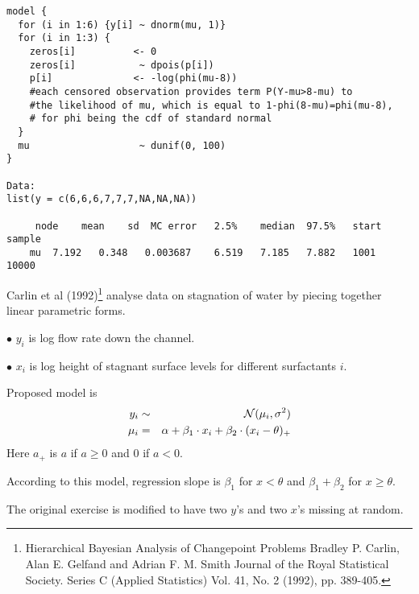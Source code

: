 \documentclass[12pt]{article}
\newcommand{\ba}{\begin{eqnarray*}}
\newcommand{\ea}{\end{eqnarray*}}
\begin{document}
\begin{verbatim}
model {
  for (i in 1:6) {y[i] ~ dnorm(mu, 1)}
  for (i in 1:3) {
    zeros[i]          <- 0
    zeros[i]           ~ dpois(p[i])
    p[i]              <- -log(phi(mu-8))
    #each censored observation provides term P(Y-mu>8-mu) to
    #the likelihood of mu, which is equal to 1-phi(8-mu)=phi(mu-8),
    # for phi being the cdf of standard normal
  }
  mu                   ~ dunif(0, 100)
}

Data:
list(y = c(6,6,6,7,7,7,NA,NA,NA))

	 node	 mean	 sd	 MC error	2.5%	median	97.5%	start	sample
	mu	7.192	0.348	0.003687	6.519	7.185	7.882	1001	10000
\end{verbatim}




\vspace*{0.2in}

Carlin et al (1992)\footnote{Hierarchical Bayesian Analysis of Changepoint Problems
Bradley P. Carlin, Alan E. Gelfand and Adrian F. M. Smith
Journal of the Royal Statistical Society. Series C (Applied Statistics)
Vol. 41, No. 2 (1992), pp. 389-405.}
analyse data on stagnation of water by  piecing together
linear parametric forms.

$\bullet $  $y_i$ is log flow rate down the channel.

$\bullet $  $x_i$ is log height of stagnant surface levels for 
different surfactants  $i$.

Proposed model is
\ba
y_i &\sim& {\cal N}(\mu_i, \sigma^2)\\
\mu_i &=& \alpha + \beta_1 \cdot x_i + \beta_2 \cdot (x_i - \theta)_+
\ea
Here $a_+$ is $a$ if $a \geq 0$ and 0 if $a < 0$.

According to this model, regression slope is $\beta_1$ for
$  x < \theta$ 
and $\beta_1 + \beta_2$ for $ x \geq \theta.$

The original exercise is modified to have two $y$'s and two $x$'s missing 
at random.
\end{document}
